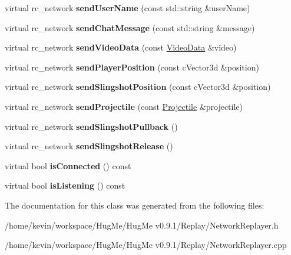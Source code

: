 \begin{DoxyCompactItemize}
\item 
\hypertarget{classNetworkReplayer_a49bb75f65853c34c0bdafa6aba066056}{
virtual rc\_\-network {\bfseries sendUserName} (const std::string \&userName)}
\label{classNetworkReplayer_a49bb75f65853c34c0bdafa6aba066056}

\item 
\hypertarget{classNetworkReplayer_a689bc26f935bb0d7f72d3f69cea6e98c}{
virtual rc\_\-network {\bfseries sendChatMessage} (const std::string \&message)}
\label{classNetworkReplayer_a689bc26f935bb0d7f72d3f69cea6e98c}

\item 
\hypertarget{classNetworkReplayer_ab7f69701316a3387da91d2146ea97b5e}{
virtual rc\_\-network {\bfseries sendVideoData} (const \hyperlink{structVideoData}{VideoData} \&video)}
\label{classNetworkReplayer_ab7f69701316a3387da91d2146ea97b5e}

\item 
\hypertarget{classNetworkReplayer_a7c9a5203b80840fee0157d506ff14f61}{
virtual rc\_\-network {\bfseries sendPlayerPosition} (const cVector3d \&position)}
\label{classNetworkReplayer_a7c9a5203b80840fee0157d506ff14f61}

\item 
\hypertarget{classNetworkReplayer_ad8ad840c17aa86b890857ef714eb019a}{
virtual rc\_\-network {\bfseries sendSlingshotPosition} (const cVector3d \&position)}
\label{classNetworkReplayer_ad8ad840c17aa86b890857ef714eb019a}

\item 
\hypertarget{classNetworkReplayer_a7ebdbb74bb8e3b1fdc877d3c8157d342}{
virtual rc\_\-network {\bfseries sendProjectile} (const \hyperlink{classProjectile}{Projectile} \&projectile)}
\label{classNetworkReplayer_a7ebdbb74bb8e3b1fdc877d3c8157d342}

\item 
\hypertarget{classNetworkReplayer_a98342ea3e802e9108b6d3329d977eade}{
virtual rc\_\-network {\bfseries sendSlingshotPullback} ()}
\label{classNetworkReplayer_a98342ea3e802e9108b6d3329d977eade}

\item 
\hypertarget{classNetworkReplayer_a8bc7c3c55dd7f7227d63335206a905a0}{
virtual rc\_\-network {\bfseries sendSlingshotRelease} ()}
\label{classNetworkReplayer_a8bc7c3c55dd7f7227d63335206a905a0}

\item 
\hypertarget{classNetworkReplayer_a3656c06c32e76a30ac48055a0695d99a}{
virtual bool {\bfseries isConnected} () const }
\label{classNetworkReplayer_a3656c06c32e76a30ac48055a0695d99a}

\item 
\hypertarget{classNetworkReplayer_a869c34b845f18eb262ead68542662aa4}{
virtual bool {\bfseries isListening} () const }
\label{classNetworkReplayer_a869c34b845f18eb262ead68542662aa4}

\end{DoxyCompactItemize}


The documentation for this class was generated from the following files:\begin{DoxyCompactItemize}
\item 
/home/kevin/workspace/HugMe/HugMe v0.9.1/Replay/NetworkReplayer.h\item 
/home/kevin/workspace/HugMe/HugMe v0.9.1/Replay/NetworkReplayer.cpp\end{DoxyCompactItemize}
